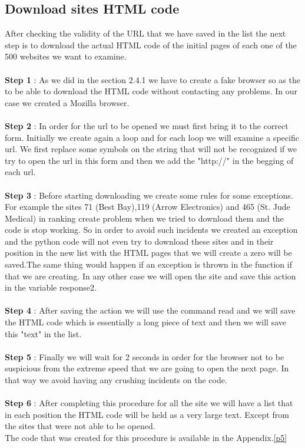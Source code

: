 \documentclass{book}
\begin{document}
\subsection{Download sites HTML code}
After checking the validity of the URL that we have saved in the list the next step is to download the actual HTML code of the initial pages of each one of the 500 websites we want to examine.\\\\
\textbf{Step 1} : As we did in the section 2.4.1 we have to create a fake browser so as the to be able to download the HTML code without contacting any problems. In our case we created a Mozilla browser.\\\\
\textbf{Step 2} : In order for the url to be opened we must first bring it to the correct form. Initially we create again a loop and for each loop we will examine a specific url. We first replace some symbols on the string that will not be recognized if we try to open the url in this form and then we add the "http://" in the begging of each url.\\ \\
\textbf{Step 3} : Before starting downloading we create some rules for some exceptions. For example the sites 71 (Best Bay),119 (Arrow Electronics) and 465 (St. Jude Medical) in ranking create problem when we tried to download them and the code is stop working. So in order to avoid such incidents we created an exception and the python code will not even try to download these sites and in their position in the new list with the HTML pages that we will create a zero will be saved.The same thing would happen if an exception is thrown in the function if that we are creating. In any other case we will open the site and save this action in the variable response2.\\\\
\textbf{Step 4} : After saving the action we will use the command read and we will save the HTML code which is essentially a long piece of text and then we will save this "text" in the list.\\\\
\textbf{Step 5} : Finally we will wait for 2 seconds in order for the browser not to be suspicious from the extreme speed that we are going to open the next page. In that way we avoid having any crushing incidents on the code.\\\\
\textbf{Step 6} : After completing this procedure for all the site we will have a list that in each position the HTML code will be held as a very large text. Except from the sites that were not able to be opened.\\
The code that was created for this procedure is available in the Appendix.\ref{p5}
\end{document}
